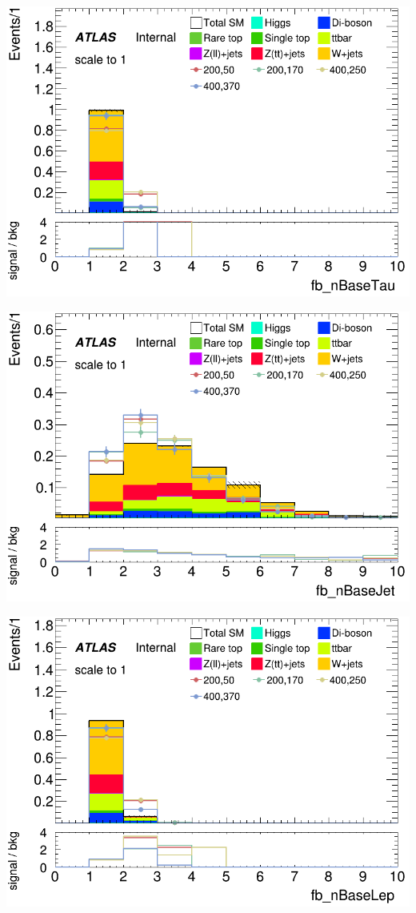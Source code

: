 \documentclass[usenames,dvipsnames]{beamer}
\begin{document}
\begin{frame}
\begin{minipage}{0.2\textwidth}
        \includegraphics[width=\textwidth]{graphics/LH_met_sig/LH_fb_nBaseTau_norm.png}
    \end{minipage}
    \hfill
    \begin{minipage}{0.2\textwidth}
        \centering
        \includegraphics[width=\textwidth]{graphics/LH_met_sig/LH_fb_nBaseJet_norm.png}
    \end{minipage}
    \begin{minipage}{0.2\textwidth}
        \centering
        \includegraphics[width=\textwidth]{graphics/LH_met_sig/LH_fb_nBaseLep_norm.png}

\end{minipage}
\end{frame}
\end{document}

